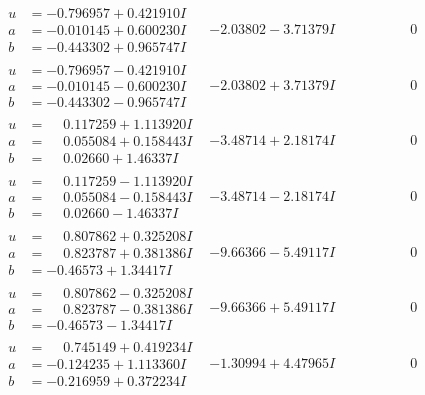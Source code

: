 \documentclass[1p]{elsarticle_modified}
\theoremstyle{definition}
\begin{document}
$$\begin{array}{c|c|c}
\begin{aligned}
u &= -0.796957 + 0.421910 I \\
a &= -0.010145 + 0.600230 I \\
b &= -0.443302 + 0.965747 I\end{aligned}
 & -2.03802 - 3.71379 I & \phantom{-0.000000 } 0 \\ \hline\begin{aligned}
u &= -0.796957 - 0.421910 I \\
a &= -0.010145 - 0.600230 I \\
b &= -0.443302 - 0.965747 I\end{aligned}
 & -2.03802 + 3.71379 I & \phantom{-0.000000 } 0 \\ \hline\begin{aligned}
u &= \phantom{-}0.117259 + 1.113920 I \\
a &= \phantom{-}0.055084 + 0.158443 I \\
b &= \phantom{-}0.02660 + 1.46337 I\end{aligned}
 & -3.48714 + 2.18174 I & \phantom{-0.000000 } 0 \\ \hline\begin{aligned}
u &= \phantom{-}0.117259 - 1.113920 I \\
a &= \phantom{-}0.055084 - 0.158443 I \\
b &= \phantom{-}0.02660 - 1.46337 I\end{aligned}
 & -3.48714 - 2.18174 I & \phantom{-0.000000 } 0 \\ \hline\begin{aligned}
u &= \phantom{-}0.807862 + 0.325208 I \\
a &= \phantom{-}0.823787 + 0.381386 I \\
b &= -0.46573 + 1.34417 I\end{aligned}
 & -9.66366 - 5.49117 I & \phantom{-0.000000 } 0 \\ \hline\begin{aligned}
u &= \phantom{-}0.807862 - 0.325208 I \\
a &= \phantom{-}0.823787 - 0.381386 I \\
b &= -0.46573 - 1.34417 I\end{aligned}
 & -9.66366 + 5.49117 I & \phantom{-0.000000 } 0 \\ \hline\begin{aligned}
u &= \phantom{-}0.745149 + 0.419234 I \\
a &= -0.124235 + 1.113360 I \\
b &= -0.216959 + 0.372234 I\end{aligned}
 & -1.30994 + 4.47965 I & \phantom{-0.000000 } 0 \\ \hline\begin{aligned}

\end{aligned}
\end{array}$$
\end{document}
